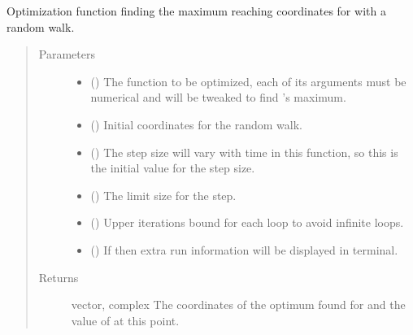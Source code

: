\documentclass[letterpaper,10pt,english]{sphinxmanual}
\begin{document}
\begin{fulllineitems}
\label{\detokenize{opti:opti.optimize}}
Optimization function finding the maximum reaching coordinates for 
with a random walk.
\begin{quote}\begin{description}
\item[{Parameters}] \leavevmode\begin{itemize}
\item {} 
 () \textendash{} The function to be optimized, each of its arguments must 
be numerical and will be tweaked to find ’s maximum.

\item {} 
 () \textendash{} Initial coordinates for the random walk.

\item {} 
 () \textendash{} The step size will vary with time in this function, so
this is the initial value for the step size.

\item {} 
 () \textendash{} The limit size for the step.

\item {} 
 () \textendash{} Upper iterations bound for each loop to avoid infinite 
loops.

\item {} 
 () \textendash{} If  then extra run information will be 
displayed in terminal.

\end{itemize}

\item[{Returns}] \leavevmode
vector, complex \textendash{} The coordinates of the optimum found for 
 and the value of  at this point.

\end{description}\end{quote}

\end{fulllineitems}
\end{document}
